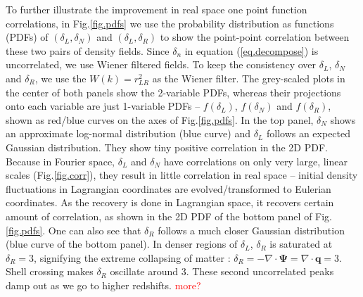\documentclass[aps,prd,twocolumn,superscriptaddress,amsfont,amssymb,amsmath,nofootinbib,showpacs,balancelastpage]{revtex4-1}
\newcommand{\bs}{\boldsymbol}
\newcommand{\tcr}{\textcolor{red}}
\begin{document}
To further illustrate the improvement in real space
one point function correlations,
in Fig.\ref{fig.pdfs} we use the probability distribution
as functions (PDFs) of $(\delta_L,\delta_N)$ and $(\delta_L,\delta_R)$
to show the point-point correlation between these two pairs of density
fields. Since $\delta_n$ in equation (\ref{eq.decompose}) is
uncorrelated, we use Wiener filtered fields. To keep the
consistency over $\delta_L$, $\delta_N$ and $\delta_R$, we
use the $W(k)=r^2_{LR}$ as the Wiener filter.
The grey-scaled plots in the center of both panels show the 2-variable PDFs,
whereas their projections onto each variable are just
1-variable PDFs -- $f(\delta_L)$, $f(\delta_N)$ and $f(\delta_R)$, shown
as red/blue curves on the axes of Fig.\ref{fig.pdfs}.
In the top panel, $\delta_N$ shows an approximate log-normal
distribution (blue curve) and $\delta_L$ follows an expected
Gaussian distribution. They show tiny positive correlation in the
2D PDF.
Because in Fourier space, $\delta_L$ and $\delta_N$ have
correlations on only very large, linear scales (Fig.\ref{fig.corr}),
they result in little correlation in real space -- initial density fluctuations
in Lagrangian coordinates are evolved/transformed to Eulerian coordinates.
As the recovery is done in Lagrangian space, it recovers
certain amount of correlation, as shown in the 2D PDF of the bottom panel
of Fig.\ref{fig.pdfs}. One can also see that $\delta_R$ follows
a much closer Gaussian distribution (blue curve of the bottom panel).
In denser regions of $\delta_L$, $\delta_R$ is saturated at
$\delta_R=3$, signifying the extreme collapsing of matter \citep{2013MNRAS.428..141N}:
$\delta_R=-\nabla\cdot\bs\Psi=\nabla\cdot\bs q=3$. Shell crossing
makes $\delta_R$ oscillate around 3. These second uncorrelated peaks
damp out as we go to higher redshifts. \tcr{more?}
\end{document}
